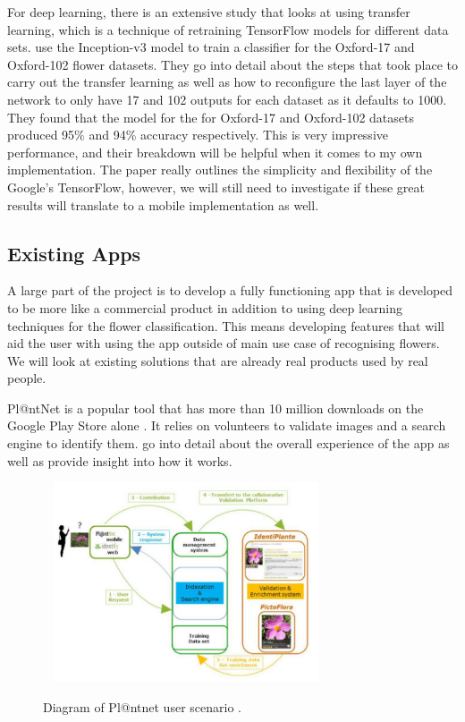 \documentclass[12pt,a4paper]{report}
\begin{document}
\par

For deep learning, there is an extensive study that looks at using transfer learning, which is a technique of retraining
TensorFlow models for different data sets. \citet{Xia2017} use the Inception-v3 model to train a classifier for 
the Oxford-17 and Oxford-102 flower datasets. They go into detail about the steps that took place to carry out the 
transfer learning as well as how to reconfigure the last layer of the network to only have 17 and 102 outputs for each 
dataset as it defaults to 1000. They found that the model for the for Oxford-17 and Oxford-102 datasets 
produced 95\% and 94\% accuracy respectively. This is very impressive performance, and their breakdown will be helpful 
when it comes to my own implementation. The paper really outlines the simplicity and flexibility of the Google's 
TensorFlow, however, we will still need to investigate if these great results will translate to a mobile implementation 
as well.

\subsection{Existing Apps}

A large part of the project is to develop a fully functioning app that is developed to be more like a commercial product
in addition to using deep learning techniques for the flower classification. This means developing features that will 
aid the user with using the app outside of main use case of recognising flowers. We will look at existing solutions that
are already real products used by real people.

\par

Pl@ntNet is a popular tool that has more than 10 million downloads on the Google Play Store alone \citep{googleplay}. 
It relies on volunteers to validate images and a search engine to identify them. \citet{joly:hal-01182775}
go into detail about the overall experience of the app as well as provide insight into how it works.

\begin{figure}[h]\
    \centering
    \includegraphics[width=0.7\textwidth]{plantnet.png}
    \caption{Diagram of Pl@ntnet user scenario \citep{joly:hal-01182775}.}
    \label{fig:plantnet}
\end{figure}
\end{document}
